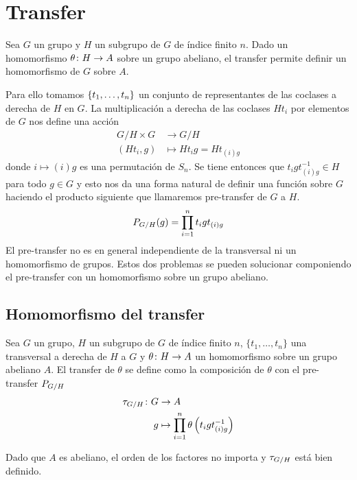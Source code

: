 
\chapter{Transfer}

Sea $G$ un grupo y $H$ un subgrupo de $G$ de índice finito $n$. Dado un homomorfismo $\theta\colon H\to A$ sobre un grupo abeliano, el transfer permite definir un homomorfismo de $G$ sobre $A$. %

Para ello tomamos $\{t_1,\ldots,t_n\}$ un conjunto de representantes de las coclases a derecha de $H$ en $G$. La multiplicación a derecha de las coclases $Ht_i$ por elementos de $G$ nos define una acción
\begin{align}\label{minitransfer}
	G/H\times G &\to {G/H} \nonumber\\
	(Ht_i,g) &\mapsto Ht_ig = Ht_{(i)g}
\end{align}
donde $i\mapsto (i)g$ es una permutación de $S_n$. Se tiene entonces que $t_igt_{(i)g}^{-1}\in H$ para todo $g\in G$ y esto nos da una forma natural de definir una función sobre $G$ haciendo el producto siguiente que llamaremos pre-transfer de $G$ a $H$.
\begin{equation}
	{P_{G/ H}}(g)= \prod_{i=1}^n t_igt_{(i)g}
\end{equation}
El pre-transfer no es en general independiente de la transversal ni un homomorfismo de grupos. Estos dos problemas se pueden solucionar componiendo el pre-transfer con un homomorfismo sobre un grupo abeliano. %

\section{Homomorfismo del transfer}

\begin{definicion}
	Sea $G$ un grupo, $H$ un subgrupo de $G$ de índice finito $n$, $\{t_1,\ldots, t_n\}$ una transversal a derecha de $H$ a $G$ y $\theta\colon H\to A$ un homomorfismo sobre un grupo abeliano $A$. El transfer de $\theta$ se define como la composición de $\theta$ con el pre-transfer $P_{G/ H}$
	\begin{align}
		{\tau_{G/ H}} \colon 	G &\to A \nonumber \\
							g &\mapsto \prod_{i=1}^n \theta\left(t_igt_{(i)g}^{-1}\right)
	\end{align}
	
	Dado que $A$ es abeliano, el orden de los factores no importa y $\tau_{G/ H}$ está bien definido.  %
\end{definicion}

